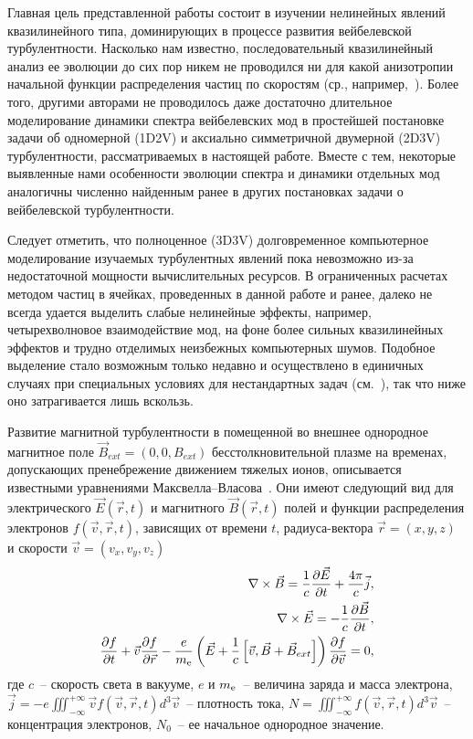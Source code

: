 Главная цель представленной работы состоит в изучении нелинейных явлений квазилинейного типа, доминирующих в процессе развития вейбелевской турбулентности. Насколько нам известно, последовательный квазилинейный анализ ее эволюции до сих пор никем не проводился ни для какой анизотропии начальной функции распределения частиц по скоростям (ср., например,~\cite{Ruyer2015,Pokhotelov2011,Davidson1972}). Более того, другими авторами не проводилось даже достаточно длительное моделирование динамики спектра вейбелевских мод в простейшей постановке задачи об одномерной (1D2V) и аксиально симметричной двумерной (2D3V) турбулентности, рассматриваемых в настоящей работе. Вместе с тем, некоторые выявленные нами особенности эволюции спектра и динамики отдельных мод аналогичны численно найденным ранее в других постановках задачи о вейбелевской турбулентности.

Следует отметить, что полноценное (3D3V) долговременное компьютерное моделирование изучаемых турбулентных явлений пока невозможно из-за недостаточной мощности вычислительных ресурсов. В ограниченных расчетах методом частиц в ячейках, проведенных в данной работе и ранее, далеко не всегда удается выделить слабые нелинейные эффекты, например, четырехволновое взаимодействие мод, на фоне более сильных квазилинейных эффектов и трудно отделимых неизбежных компьютерных шумов. Подобное выделение стало возможным только недавно и осуществлено в единичных случаях при специальных условиях для нестандартных задач (см.~\cite{Garasev2018,Garasev2021}), так что ниже оно затрагивается лишь вскользь.

Развитие магнитной турбулентности в помещенной во внешнее однородное магнитное поле $\vec{B}_{ext}=(0, 0, B_{ext})$ бесстолкновительной плазме на временах, допускающих пренебрежение движением тяжелых ионов, описывается известными уравнениями  Максвелла--Власова~\cite{???}. Они имеют следующий вид  для электрического $\vec{E}(\vec{r}, t)$ и магнитного $\vec{B}(\vec{r}, t)$ полей и функции распределения электронов $f(\vec{v},\vec{r}, t)$, зависящих от времени $t$, радиуса-вектора $\vec{r}=\left(x,y,z\right)$ и скорости $\vec{v}=\left(v_x,v_y,v_z\right)$
\begin{align}
     \label{eq:maxw1} 
    \nabla \times \vec{B}=\dfrac{1}{c}\dfrac{\partial \vec{E}}{\partial t}+\dfrac{4\pi}{c}\vec{j}, \\
    \label{eq:maxw2}
    \nabla \times \vec{E}=-\dfrac{1}{c}\dfrac{\partial \vec{B}}{\partial t}, \\
    \dfrac{\partial f}{\partial t}+\vec{v}\dfrac{\partial f}{\partial \vec{r}}-\dfrac{e}{m_\mathrm{e}} \left(\vec{E}+\dfrac{1}{c}\left[\vec{v},\vec{B}+\vec{B}_{ext}\right]\right) \dfrac{\partial f}{\partial \vec{v}}=0,
    \label{eq:Vlasov}
\end{align}
где $c$~-- скорость света в вакууме, $e$ и $m_\mathrm{e}$~-- величина заряда и масса электрона, $\vec{j}=-e\iiint^{+\infty}_{-\infty}\vec{v}f(\vec{v},\vec{r}, t) d^3\vec{v}$~-- плотность тока, $N=\iiint^{+\infty}_{-\infty}f(\vec{v},\vec{r}, t) d^3\vec{v}$~-- концентрация электронов, $N_0$~-- ее начальное однородное значение. 

